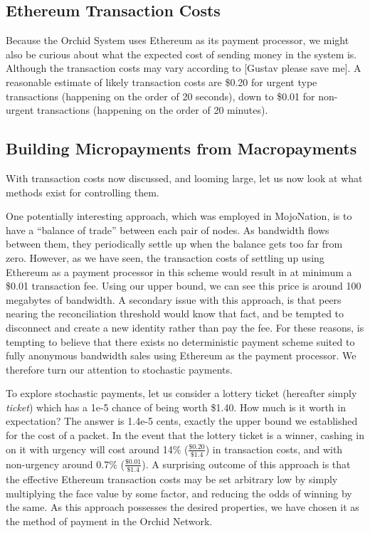 \documentclass{article}
\newcommand{\orchid}{Orchid}
\newcommand{\Orchid}{\orchid}
\begin{document}
\subsection{Ethereum Transaction Costs}

Because the \Orchid{} System uses Ethereum as its payment processor, we might also be curious about what the expected cost of sending money in the system is. Although the transaction costs may vary according to [Gustav please save me]. A reasonable estimate of likely transaction costs are \$0.20 for urgent type transactions (happening on the order of 20 seconds), down to \$0.01 for non-urgent transactions (happening on the order of 20 minutes).

\subsection{Building Micropayments from Macropayments}

With transaction costs now discussed, and looming large, let us now look at what methods exist for controlling them.

One potentially interesting approach, which was employed in MojoNation\cite{mojonation}, is to have a ``balance of trade'' between each pair of nodes. As bandwidth flows between them, they periodically settle up when the balance gets too far from zero. However, as we have seen, the transaction costs of settling up using Ethereum as a payment processor in this scheme would result in at minimum a \$0.01 transaction fee. Using our upper bound, we can see this price is around 100 megabytes of bandwidth. A secondary issue with this approach, is that peers nearing the reconciliation threshold would know that fact, and be tempted to disconnect and create a new identity rather than pay the fee. For these reasons, is tempting to believe that there exists no deterministic payment scheme suited to fully anonymous bandwidth sales using Ethereum as the payment processor. We therefore turn our attention to stochastic payments.

To explore stochastic payments, let us consider a lottery ticket (hereafter simply \emph{ticket}) which has a 1e-5 chance of being worth \$1.40. How much is it worth in expectation? The answer is 1.4e-5 cents, exactly the upper bound we established for the cost of a packet. In the event that the lottery ticket is a winner, cashing in on it with urgency will cost around 14\% ($\frac{\$0.20}{\$1.4}$) in transaction costs, and with non-urgency around 0.7\% ($\frac{\$0.01}{\$1.4}$). A surprising outcome of this approach is that the effective Ethereum transaction costs may be set arbitrary low by simply multiplying the face value by some factor, and reducing the odds of winning by the same. As this approach possesses the desired properties, we have chosen it as the method of payment in the \Orchid{} Network.
\end{document}
